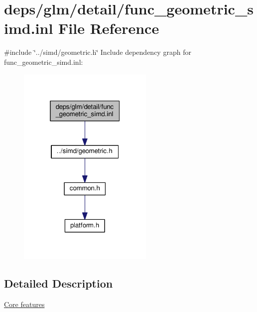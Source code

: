 \hypertarget{func__geometric__simd_8inl}{}\section{deps/glm/detail/func\+\_\+geometric\+\_\+simd.inl File Reference}
\label{func__geometric__simd_8inl}
{\ttfamily \#include \char`\"{}../simd/geometric.\+h\char`\"{}}\newline
Include dependency graph for func\+\_\+geometric\+\_\+simd.\+inl\+:
\nopagebreak
\begin{figure}[H]
\begin{center}
\leavevmode
\includegraphics[width=184pt]{d0/dbe/func__geometric__simd_8inl__incl}
\end{center}
\end{figure}


\subsection{Detailed Description}
\hyperlink{group__core}{Core features} 